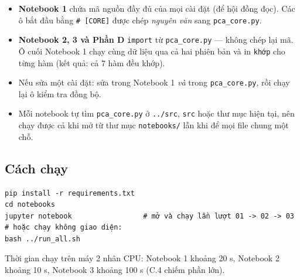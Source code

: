 \documentclass[11pt,a4paper]{article}
\newcommand{\code}[1]{\texttt{#1}}
\begin{document}
\begin{center}
\end{center}

\begin{itemize}
\item \textbf{Notebook 1} chứa mã nguồn đầy đủ của mọi cài đặt (để hội đồng đọc). Các ô bắt đầu bằng \code{\# [CORE]} được chép \emph{nguyên văn} sang \code{pca\_core.py}.
\item \textbf{Notebook 2, 3 và Phần D} \code{import} từ \code{pca\_core.py} — không chép lại mã. Ô cuối Notebook 1 chạy cùng dữ liệu qua cả hai phiên bản và in \code{khớp} cho từng hàm (kết quả: cả 7 hàm đều khớp).
\item Nếu sửa một cài đặt: sửa trong Notebook 1 \emph{và} trong \code{pca\_core.py}, rồi chạy lại ô kiểm tra đồng bộ.
\item Mỗi notebook tự tìm \code{pca\_core.py} ở \code{../src}, \code{src} hoặc thư mục hiện tại, nên chạy được cả khi mở từ thư mục \code{notebooks/} lẫn khi để mọi file chung một chỗ.
\end{itemize}

\subsection{Cách chạy}
\begin{verbatim}
pip install -r requirements.txt
cd notebooks
jupyter notebook                 # mở và chạy lần lượt 01 -> 02 -> 03
# hoặc chạy không giao diện:
bash ../run_all.sh
\end{verbatim}
Thời gian chạy trên máy 2 nhân CPU: Notebook 1 khoảng 20 s, Notebook 2 khoảng 10 s, Notebook 3 khoảng 100 s (C.4 chiếm phần lớn).
\end{document}
